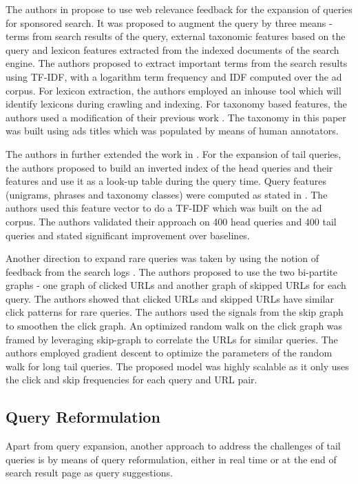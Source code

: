 The authors in \cite{broder2008search} propose to use web relevance feedback for the expansion of queries for sponsored search. It was proposed to augment the query by three means - terms from search results of the query, external taxonomic features based on the query and lexicon features extracted from the indexed documents of the search engine. The authors proposed to extract important terms from the search results using TF-IDF, with a logarithm term frequency and IDF computed over the ad corpus. For lexicon extraction, the authors employed an inhouse tool which will identify lexicons during crawling and indexing. For taxonomy based features, the authors used a modification of their previous work \cite{broder2007robust}. The taxonomy in this paper was built using ads titles which was populated by means of human annotators. 

The authors in \cite{broder2009online} further extended the work in \cite{broder2007robust, broder2008search}. For the expansion of tail queries, the authors proposed to build an inverted index of the head queries and their features and use it as a look-up table during the query time. Query features (unigrams, phrases and taxonomy classes) were computed as stated in \cite{broder2008search}. The authors used this feature vector to do a TF-IDF which was built on the ad corpus. The authors validated their approach on 400 head queries and 400 tail queries and stated significant improvement over baselines.



Another direction to expand rare queries was taken by using the notion of feedback from the search logs \cite{song2010optimal}. The authors proposed to use the two bi-partite graphs - one graph of clicked URLs and another graph of skipped URLs for each query. The authors showed that clicked URLs and skipped URLs have similar click patterns for rare queries. The authors used the signals from the skip graph to smoothen the click graph. An optimized random walk on the click graph was framed by leveraging skip-graph to correlate the URLs for similar queries. The authors employed gradient descent to optimize the parameters of the random walk for long tail queries. The proposed model was highly scalable as it only uses the click and skip frequencies for each query and URL pair. 

\subsection{Query Reformulation}
Apart from query expansion, another approach to address the challenges of tail queries is by means of query reformulation, either in real time or at the end of search result page as query suggestions.

